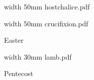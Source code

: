 \bigskip

\pdfximage width 50mm {hostchalice.pdf}

\centerline{\pdfrefximage \pdflastximage}



\bigskip

\eject


\paginaproxima


\bigskip

\pdfximage width 50mm {crucifixion.pdf}

\centerline{\pdfrefximage \pdflastximage}



\bigskip

\eject

\beginpart Easter


\bigskip


\eject


\bigskip


\eject


\bigskip



\bigskip

\pdfximage width 30mm {lamb.pdf}

\centerline{\pdfrefximage \pdflastximage}



\bigskip

\eject


\paginaproxima

\beginpart Pentecost


